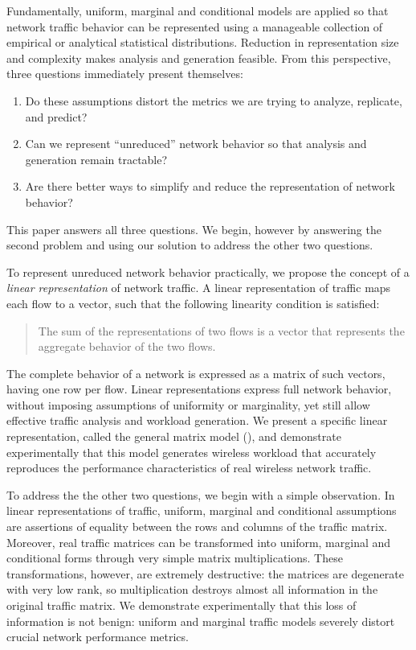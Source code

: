 \documentclass[twocolumn,final]{svjour3}
\begin{document}
Fundamentally, uniform, marginal and conditional models are applied so that network traffic behavior can be represented using a manageable collection of empirical or analytical statistical distributions.
Reduction in representation size and complexity makes analysis and generation feasible.
From this perspective, three questions immediately present themselves:
\begin{enumerate}
\item Do these assumptions distort the metrics we are trying to analyze, replicate, and predict?
\item Can we represent ``unreduced'' network behavior so that analysis and generation remain tractable?
\item Are there better ways to simplify and reduce the representation of network behavior?
\end{enumerate}
This paper answers all three questions. We begin, however by answering the second problem and  
using our solution to address the other two questions.

To represent unreduced network behavior practically, we propose the concept of a \emph{linear representation} of network traffic.
A linear representation of traffic maps each flow to a vector, such that the following linearity condition is satisfied:
\begin{quote}
The sum of the representations of two flows is a vector that represents the aggregate behavior of the two flows.
\end{quote}
The complete behavior of a network is expressed as a matrix of such vectors, having one row per flow.
Linear representations express full network behavior, without imposing assumptions of uniformity or marginality, yet still allow effective traffic analysis and workload generation.
We present a specific linear representation, called the general matrix model (), and demonstrate experimentally that this model generates wireless workload that accurately reproduces the performance characteristics of real wireless network traffic.


To address the the other two questions, we begin with a simple observation.
In linear representations of traffic, uniform, marginal and conditional assumptions are assertions of equality between the rows and columns of the traffic matrix.
Moreover, real traffic matrices can be transformed into uniform, marginal and conditional forms through very simple matrix multiplications.
These transformations, however, are extremely destructive: the matrices are degenerate with very low rank, so multiplication destroys almost all information in the original traffic matrix.
We demonstrate experimentally that this loss of information is not benign:
uniform and marginal traffic models severely distort crucial network performance metrics.
\end{document}
